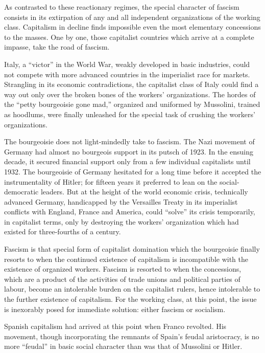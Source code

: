 As contrasted to these reactionary regimes, the special character of fascism consists in its extirpation of any and all independent organizations of the working class. Capitalism in decline finds impossible even the most elementary concessions to the masses. One by one, those capitalist countries which arrive at a complete impasse, take the road of fascism.

Italy, a ``victor'' in the World War, weakly developed in basic industries, could not compete with more advanced countries in the imperialist race for markets. Strangling in its economic contradictions, the capitalist class of Italy could find a way out only over the broken bones of the workers’ organizations. The hordes of the ``petty bourgeoisie gone mad,'' organized and uniformed by Mussolini, trained as hoodlums, were finally unleashed for the special task of crushing the workers’ organizations.

The bourgeoisie does not light-mindedly take to fascism. The Nazi movement of Germany had almost no bourgeois support in its putsch of 1923. In the ensuing decade, it secured financial support only from a few individual capitalists until 1932. The bourgeoisie of Germany hesitated for a long time before it accepted the instrumentality of Hitler; for fifteen years it preferred to lean on the social-democratic leaders. But at the height of the world economic crisis, technically advanced Germany, handicapped by the Versailles Treaty in its imperialist conflicts with England, France and America, could ``solve'' its crisis temporarily, in capitalist terms, only by destroying the workers’ organization which had existed for three-fourths of a century.

Fascism is that special form of capitalist domination which the bourgeoisie finally resorts to when the continued existence of capitalism is incompatible with the existence of organized workers. Fascism is resorted to when the concessions, which are a product of the activities of trade unions and political parties of labour, become an intolerable burden on the capitalist rulers, hence intolerable to the further existence of capitalism. For the working class, at this point, the issue is inexorably posed for immediate solution: either fascism or socialism.

Spanish capitalism had arrived at this point when Franco revolted. His movement, though incorporating the remnants of Spain’s feudal aristocracy, is no more ``feudal'' in basic social character than was that of Mussolini or Hitler.

